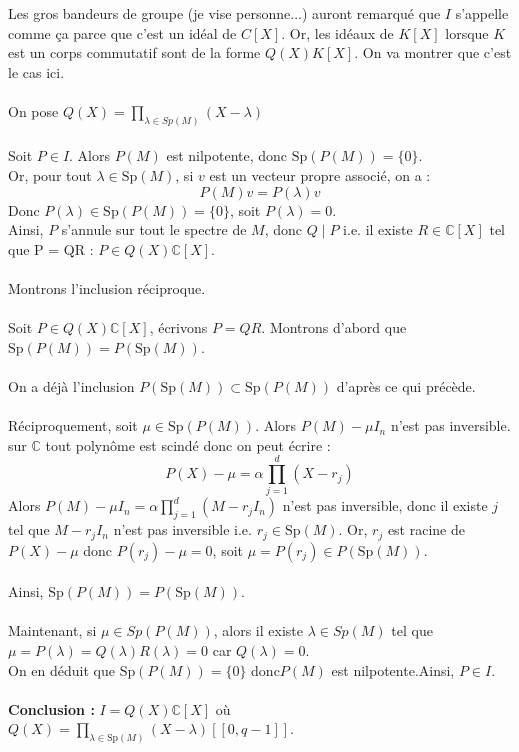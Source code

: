 \documentclass[a4paper,12pt]{article}
\begin{document}
    \begin{correctionbox}
        Les gros bandeurs de groupe (je vise personne...) auront remarqué que $I$ s'appelle comme ça parce que c'est un idéal de \(C[X]\). Or, les idéaux de \(K[X]\) lorsque $K$ est un corps commutatif sont de la forme \(Q(X)K[X]\). On va montrer que c'est le cas ici. \\\\
        On pose \(Q(X) = \prod_{\lambda \in Sp(M)} (X - \lambda)\)\\\\
        Soit \( P \in I \). Alors \( P(M) \) est nilpotente, donc \( \mathrm{Sp}(P(M)) = \{0\} \). \\[2pt]
        Or, pour tout \( \lambda \in \mathrm{Sp}(M) \), si \( v \) est un vecteur propre associé, on a :
        \[
        P(M)v = P(\lambda)v
        \]
        Donc \( P(\lambda) \in \mathrm{Sp}(P(M)) = \{0\} \), soit \( P(\lambda) = 0 \). \\[2pt]
        Ainsi, \( P \) s'annule sur tout le spectre de \( M \), donc \( Q \mid P \) i.e. il existe \(R \in \mathbb{C}[X]\) tel que P = QR : \( P \in Q(X) \mathbb{C}[X] \). \\\\
        Montrons l'inclusion réciproque.\\\\
        Soit \( P \in Q(X) \mathbb{C}[X] \), écrivons \( P = QR \). Montrons d'abord que \( \mathrm{Sp}(P(M)) = P(\mathrm{Sp}(M)) \). \\\\
        On a déjà l'inclusion \( P(\mathrm{Sp}(M)) \subset \mathrm{Sp}(P(M)) \) d'après ce qui précède. \\\\
        Réciproquement, soit \( \mu \in \mathrm{Sp}(P(M)) \). Alors \( P(M) - \mu I_n \) n'est pas inversible. \\[2pt]
        sur \( \mathbb{C} \) tout polynôme est scindé donc on peut écrire :
        \[
        P(X) - \mu = \alpha \prod_{j=1}^d (X - r_j)
        \]
        Alors \( P(M) - \mu I_n = \alpha \prod_{j=1}^d (M - r_j I_n) \) n'est pas inversible, donc il existe \( j \) tel que \( M - r_j I_n \) n'est pas inversible i.e. \( r_j \in \mathrm{Sp}(M) \). Or, \( r_j\) est racine de \(P(X) - \mu\) donc \( P(r_j) - \mu = 0 \), soit \( \mu = P(r_j) \in P(\mathrm{Sp}(M)) \). \\\\
        Ainsi, \( \mathrm{Sp}(P(M)) = P(\mathrm{Sp}(M)) \). \\\\
        Maintenant, si \( \mu \in Sp(P(M)) \), alors il existe \(\lambda \in Sp(M)\) tel que \(\mu = P(\lambda) = Q(\lambda)R(\lambda) = 0\) car \(Q(\lambda) = 0\). \\
        On en déduit que \( \mathrm{Sp}(P(M)) = \{0\} \) donc\( P(M) \) est nilpotente.Ainsi, \( P \in I \). \\\\
        \textbf{Conclusion :} \( I = Q(X) \mathbb{C}[X] \) où \( Q(X) = \prod_{\lambda \in \mathrm{Sp}(M)} (X - \lambda) [\![ 0, q-1 ]\!] \).
    \end{correctionbox}
\end{document}
